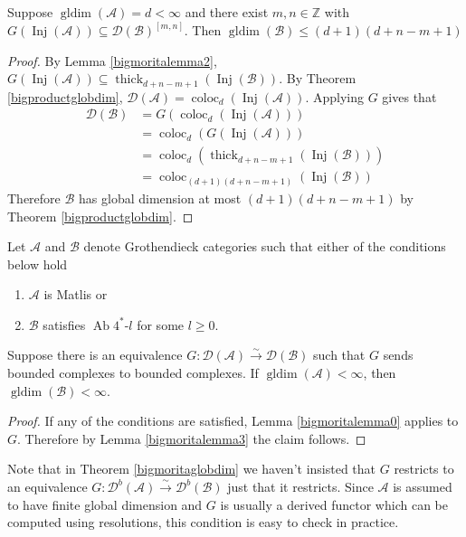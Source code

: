 \documentclass[12pt,oneside]{amsart}
\DeclareMathOperator*{\Inj}{Inj}
\DeclareMathOperator{\coloc}{coloc}
\DeclareMathOperator{\thick}{thick}
\DeclareMathOperator{\gldim}{gldim}
\DeclareMathOperator{\Ab}{Ab}
\begin{document}
\begin{lemma} \label{bigmoritalemma3}
Suppose $\gldim(\mathcal{A}) = d < \infty$ and there exist $m,n \in \mathbb{Z}$ with $G(\Inj(\mathcal{A})) \subseteq \mathcal{D}(\mathcal{B})^{[m,n]}$. Then $\gldim(\mathcal{B}) \leq (d+1)(d+n-m+1)$
\end{lemma}

\begin{proof}
By Lemma \ref{bigmoritalemma2}, $G(\Inj(\mathcal{A})) \subseteq \thick_{d + n -m+ 1}(\Inj(\mathcal{B}))$. By Theorem \ref{bigproductglobdim}, $\mathcal{D}(\mathcal{A}) = \coloc_d(\Inj(\mathcal{A}))$. Applying $G$ gives that
\begin{align*}
\mathcal{D}(\mathcal{B}) &= G(\coloc_d(\Inj(\mathcal{A}))) \\ 
&= \coloc_d(G(\Inj(\mathcal{A}))) \\
& = \coloc_d(\thick_{d+n-m+1}(\Inj(\mathcal{B}))) \\
& = \coloc_{(d+1)(d+n-m+1)}(\Inj(\mathcal{B}))
\end{align*}
Therefore $\mathcal{B}$ has global dimension at most $(d+1)(d+n-m+1)$ by Theorem \ref{bigproductglobdim}. 
\end{proof}

\begin{theorem} \label{bigmoritaglobdim}
Let $\mathcal{A}$ and $\mathcal{B}$ denote Grothendieck categories such that either of the conditions below hold
\begin{enumerate}
\item $\mathcal{A}$ is Matlis or

\item $\mathcal{B}$ satisfies $\Ab 4^\ast$-$l$ for some $l \geq 0$.

\end{enumerate}
Suppose there is an equivalence $G: \mathcal{D}(\mathcal{A}) \xrightarrow{\sim} \mathcal{D}(\mathcal{B})$ such that $G$ sends bounded complexes to bounded complexes. If $\gldim(\mathcal{A}) < \infty$, then $\gldim(\mathcal{B}) < \infty$. 
\end{theorem}


\begin{proof}
If any of the conditions are satisfied, Lemma \ref{bigmoritalemma0} applies to $G$. Therefore by Lemma \ref{bigmoritalemma3} the claim follows. 
\end{proof}

\begin{remark}
Note that in Theorem \ref{bigmoritaglobdim} we haven't insisted that $G$ restricts to an equivalence $G: \mathcal{D}^b(\mathcal{A}) \xrightarrow{\sim} \mathcal{D}^b(\mathcal{B})$ just that it restricts. Since $\mathcal{A}$ is assumed to have finite global dimension and $G$ is usually a derived functor which can be computed using resolutions, this condition is easy to check in practice.
\end{remark}
\end{document}
